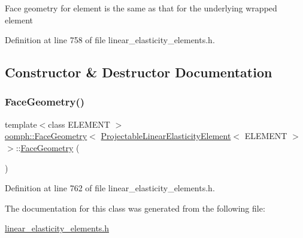 Face geometry for element is the same as that for the underlying wrapped element 

Definition at line 758 of file linear\+\_\+elasticity\+\_\+elements.\+h.



\subsection{Constructor \& Destructor Documentation}
\mbox{\label{classoomph_1_1FaceGeometry_3_01ProjectableLinearElasticityElement_3_01ELEMENT_01_4_01_4_aee713619887054aa197a81ec1dba31bf}} 
\subsubsection{\texorpdfstring{Face\+Geometry()}{FaceGeometry()}}
{\footnotesize\ttfamily template$<$class E\+L\+E\+M\+E\+NT $>$ \\
\hyperlink{classoomph_1_1FaceGeometry}{oomph\+::\+Face\+Geometry}$<$ \hyperlink{classoomph_1_1ProjectableLinearElasticityElement}{Projectable\+Linear\+Elasticity\+Element}$<$ E\+L\+E\+M\+E\+NT $>$ $>$\+::\hyperlink{classoomph_1_1FaceGeometry}{Face\+Geometry} (\begin{DoxyParamCaption}{ }\end{DoxyParamCaption})\hspace{0.3cm}{\ttfamily [inline]}}



Definition at line 762 of file linear\+\_\+elasticity\+\_\+elements.\+h.



The documentation for this class was generated from the following file\+:\begin{DoxyCompactItemize}
\item 
\hyperlink{linear__elasticity__elements_8h}{linear\+\_\+elasticity\+\_\+elements.\+h}\end{DoxyCompactItemize}
